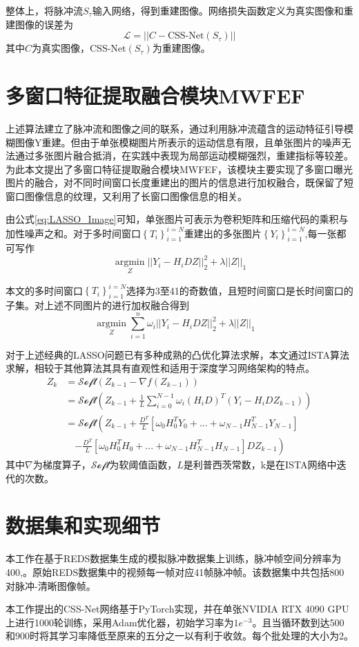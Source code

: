 整体上，将脉冲流$S_{\tau}$输入网络，得到重建图像。网络损失函数定义为真实图像和重建图像的误差为
\begin{equation}
    \mathcal{L} = ||C - \text{CSS-Net}(S_{\tau})||
    \label{eq:Loss_Function}
\end{equation}
其中$C$为真实图像，$\text{CSS-Net}(S_{\tau})$为重建图像。

\section{多窗口特征提取融合模块MWFEF}
上述算法建立了脉冲流和图像之间的联系，通过利用脉冲流蕴含的运动特征引导模糊图像Y重建。但由于单张模糊图片所表示的运动信息有限，且单张图片的噪声无法通过多张图片融合抵消，在实践中表现为局部运动模糊强烈，重建指标等较差。为此本文提出了多窗口特征提取融合模块MWFEF，该模块主要实现了多窗口曝光图片的融合，对不同时间窗口长度重建出的图片的信息进行加权融合，既保留了短窗口图像信息的纹理，又利用了长窗口图像信息的相关。

由公式\ref{eq:LASSO_Image}可知，单张图片可表示为卷积矩阵和压缩代码的乘积与加性噪声之和。对于多时间窗口$\left\{T_i\right\}_{i=1}^{i=N}$重建出的多张图片$\left\{Y_i\right\}_{i=1}^{i=N}$,每一张都可写作
\begin{equation}
    \mathop{\arg\min}\limits_{Z} ||Y_i-H_iDZ||_2^2 + \lambda||Z||_1
    \label{eq:LASSO_Image_expand}
\end{equation}

本文的多时间窗口$\left\{T_i\right\}_{i=1}^{i=N}$选择为3至41的奇数值，且短时间窗口是长时间窗口的子集。对上述不同图片的进行加权融合得到
\begin{equation}
    \mathop{\arg\min}\limits_{Z} \sum_{i=1}^{n} \omega_i||Y_i-H_iDZ||_2^2 + \lambda||Z||_1 \quad
    \label{eq:LASSO_Image_expand_fusion}
\end{equation}

对于上述经典的LASSO问题已有多种成熟的凸优化算法求解，本文通过ISTA算法求解，相较于其他算法其具有直观性和适用于深度学习网络架构的特点。
\begin{equation}
    \begin{aligned}
        Z_k & = \mathcal{Soft}(Z_{k - 1} - \nabla f(Z_{k-1}))                                                                    \\
            & = \mathcal{Soft}\left(Z_{k - 1} + \frac{1}{L}\sum_{i = 0}^{N - 1}\omega_i(H_iD)^T(Y_i - H_iDZ_{k - 1})\right)      \\
            & = \mathcal{Soft}\left(Z_{k - 1} + \frac{D^T}{L}[\omega_0H_0^TY_0 +... + \omega_{N-1}H_{N - 1}^TY_{N - 1}]\right.   \\
            & \quad\left.- \frac{D^T}{L}[\omega_0H_0^TH_0 +...+\omega_{N-1}H_{N - 1}^TH_{N - 1}]DZ_{k - 1}\right)\label{eq:ISTA}
    \end{aligned}
\end{equation}
其中$\nabla$为梯度算子，$\mathcal{Soft}$为软阈值函数，$L$是利普西茨常数，k是在ISTA网络中迭代的次数。

\section{数据集和实现细节}
本工作在基于REDS\cite{REDS}数据集生成的模拟脉冲数据集上训练，脉冲帧空间分辨率为400,。原始REDS数据集中的视频每一帧对应41帧脉冲帧。该数据集中共包括800对脉冲-清晰图像帧。

本工作提出的CSS-Net网络基于PyTorch实现，并在单张NVIDIA RTX 4090 GPU上进行1000轮训练，采用Adam优化器，初始学习率为$1e^{-3}$。且当循环数到达500和900时将其学习率降低至原来的五分之一以有利于收敛。每个批处理的大小为2。